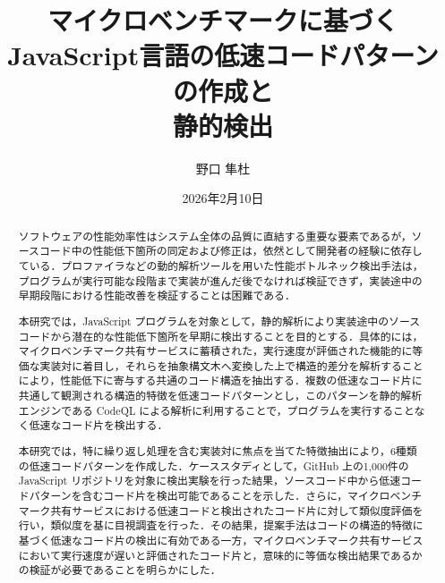 \documentclass[11pt]{jreport}
\title{マイクロベンチマークに基づく\\
    JavaScript言語の低速コードパターンの作成と\\
    静的検出}
\author{野口 隼杜}
\date{2026年2月10日}	%
\begin{document}
\maketitle

\begin{abstract}

ソフトウェアの性能効率性はシステム全体の品質に直結する重要な要素であるが，ソースコード中の性能低下箇所の同定および修正は，依然として開発者の経験に依存している．プロファイラなどの動的解析ツールを用いた性能ボトルネック検出手法は，プログラムが実行可能な段階まで実装が進んだ後でなければ検証できず，実装途中の早期段階における性能改善を検証することは困難である．

本研究では，JavaScript プログラムを対象として，静的解析により実装途中のソースコードから潜在的な性能低下箇所を早期に検出することを目的とする．具体的には，マイクロベンチマーク共有サービスに蓄積された，実行速度が評価された機能的に等価な実装対に着目し，それらを抽象構文木へ変換した上で構造的差分を解析することにより，性能低下に寄与する共通のコード構造を抽出する．複数の低速なコード片に共通して観測される構造的特徴を低速コードパターンとし，このパターンを静的解析エンジンである CodeQL による解析に利用することで，プログラムを実行することなく低速なコード片を検出する．

本研究では，特に繰り返し処理を含む実装対に焦点を当てた特徴抽出により，6種類の低速コードパターンを作成した．ケーススタディとして，GitHub 上の1,000件の JavaScript リポジトリを対象に検出実験を行った結果，ソースコード中から低速コードパターンを含むコード片を検出可能であることを示した．さらに，マイクロベンチマーク共有サービスにおける低速コードと検出されたコード片に対して類似度評価を行い，類似度を基に目視調査を行った．その結果，提案手法はコードの構造的特徴に基づく低速なコード片の検出に有効である一方，マイクロベンチマーク共有サービスにおいて実行速度が遅いと評価されたコード片と，意味的に等価な検出結果であるかの検証が必要であることを明らかにした．

\end{abstract}

\tableofcontents



\newpage
{}	%

\end{document}
